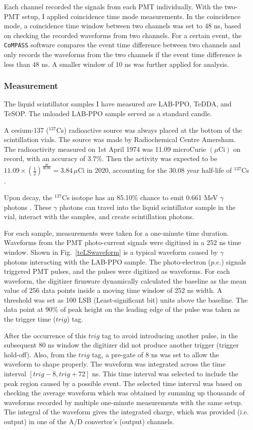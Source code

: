 Each channel recorded the signals from each PMT individually. With the two-PMT setup, I applied coincidence time mode measurements. In the coincidence mode, a coincidence time window between two channels was set to 48 ns, based on checking the recorded waveforms from two channels. For a certain event, the \texttt{CoMPASS} software compares the event time difference between two channels and only records the waveforms from the two channels if the event time difference is less than 48 ns. A smaller window of 10 ns was further applied for analysis.

\subsubsection{Measurement}

The liquid scintillator samples I have measured are LAB-PPO, TeDDA, and TeSOP. The unloaded LAB-PPO sample served as a standard candle.

A cesium-137 ($^{137}$Cs) radioactive source was always placed at the bottom of the scintillation vials. The source was made by Radiochemical Centre Amersham. The radioactivity measured on 1st April 1974 was 11.09 microCurie $(\mu\mathrm{Ci})$ on record, with an accuracy of $3.7\%$. Then the activity was expected to be 
$11.09\times ({\frac{1}{2}})^{\frac{46}{30.08}}=3.84 \, \mu\mathrm{Ci}$ in 2020, accounting for the 30.08 year half-life of $^{137}$Cs \cite{nndc}.

Upon decay, the $^{137}$Cs isotope has an 85.10\% chance to emit 0.661 MeV $\gamma$ photons \cite{nndc}. These $\gamma$ photons can travel into the liquid scintillator sample in the vial, interact with the samples, and create scintillation photons.

For each sample, measurements were taken for a one-minute time duration. Waveforms from the PMT photo-current signals were digitized in a 252 ns time window. Shown in Fig.~\ref{teLSwaveform} is a typical waveform caused by $\gamma$ photons interacting with the LAB-PPO sample. The photo-electron ($p.e.$) signals triggered PMT pulses, and the pulses were digitized as waveforms. For each waveform, the digitizer firmware dynamically calculated the baseline as the mean value of 256 data points inside a moving time window of 252 ns width. A threshold was set as 100 LSB (Least-significant bit) units above the baseline. The data point at 90\% of peak height on the leading edge of the pulse was taken as the trigger time ($trig$) tag.

After the occurrence of this $trig$ tag to avoid introducing another pulse, in the subsequent 80 ns window the digitizer did not produce another trigger (trigger hold-off). Also, from the $trig$ tag, a pre-gate of 8 ns was set to allow the waveform to shape properly. The waveform was integrated across the time interval $[trig-8, trig+72]$ ns. This time interval was selected to include the peak region caused by a possible event. The selected time interval was based on checking the average waveform which was obtained by summing up thousands of waveforms recorded by multiple one-minute measurements with the same setup. The integral of the waveform gives the integrated charge, which was provided (i.e. output) in one of the A/D convertor's (output) channels.

